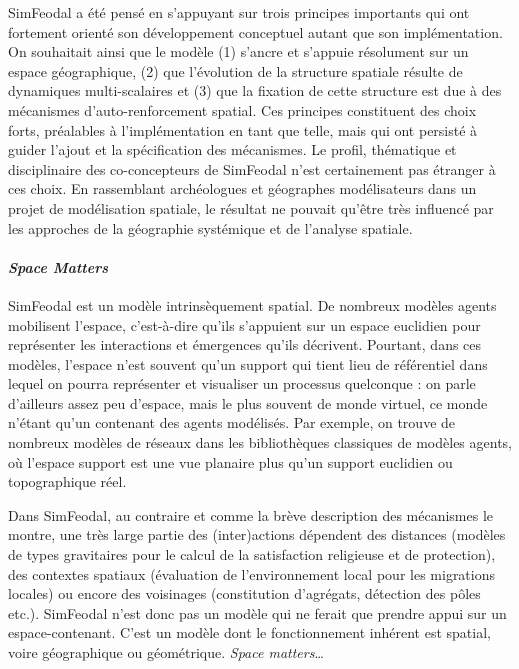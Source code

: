 SimFeodal a été pensé en s'appuyant sur trois principes importants qui ont fortement orienté son développement conceptuel autant que son implémentation. On souhaitait ainsi que le modèle (1) s'ancre et s'appuie résolument sur un espace géographique, (2) que l'évolution de la structure spatiale résulte de dynamiques multi-scalaires et (3) que la fixation de cette structure est due à des mécanismes d'auto-renforcement spatial.
Ces principes constituent des choix forts, préalables à l'implémentation en tant que telle, mais qui ont persisté à guider l'ajout et la spécification des mécanismes.
Le profil, thématique et disciplinaire des co-concepteurs de SimFeodal n'est certainement pas étranger à ces choix.
En rassemblant archéologues et géographes modélisateurs dans un projet de modélisation spatiale, le résultat ne pouvait qu'être très influencé par les approches de la géographie systémique et de l'analyse spatiale.


\paragraph{\textit{Space Matters}}

SimFeodal est un modèle intrinsèquement spatial.
De nombreux modèles agents \og mobilisent\fg{} l'espace, c'est-à-dire qu'ils s'appuient sur un espace euclidien pour représenter les interactions et émergences qu'ils décrivent.
Pourtant, dans ces modèles, l'espace n'est souvent qu'un support qui tient lieu de référentiel dans lequel on pourra représenter et visualiser un processus quelconque : on parle d'ailleurs assez peu d'espace, mais le plus souvent de \og monde virtuel\fg{}, ce monde n'étant qu'un contenant des agents modélisés.
Par exemple, on trouve de nombreux modèles de réseaux dans les bibliothèques classiques de modèles agents, où l'espace support est une vue planaire plus qu'un support euclidien ou topographique réel.

Dans SimFeodal, au contraire et comme la brève description des mécanismes le montre, une très large partie des (inter)actions dépendent des distances (modèles de types gravitaires pour le calcul de la satisfaction religieuse et de protection), des contextes spatiaux (évaluation de l'environnement local pour les migrations locales) ou encore des voisinages (constitution d'agrégats, détection des pôles etc.).
SimFeodal n'est donc pas un modèle qui ne ferait que prendre appui sur un espace-contenant.
C'est un modèle dont le fonctionnement inhérent est spatial, voire géographique ou géométrique.
\textit{Space matters}\ldots

